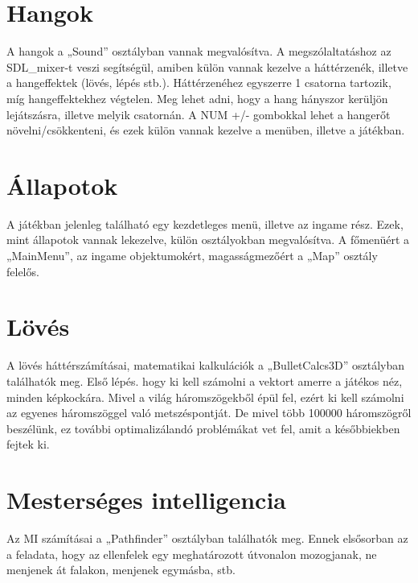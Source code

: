 \section{Hangok}

A hangok a „Sound” osztályban vannak megvalósítva. A megszólaltatáshoz az SDL\_mixer-t veszi segítségül, amiben külön vannak kezelve a háttérzenék, illetve a hangeffektek (lövés, lépés stb.). Háttérzenéhez egyszerre 1 csatorna tartozik, míg hangeffektekhez végtelen. Meg lehet adni, hogy a hang hányszor kerüljön lejátszásra, illetve melyik csatornán. A  NUM +/- gombokkal lehet a hangerőt növelni/csökkenteni, és ezek külön vannak kezelve a menüben, illetve a játékban.

\section{Állapotok}

A játékban jelenleg található egy kezdetleges menü, illetve az ingame rész. Ezek, mint állapotok vannak lekezelve, külön osztályokban megvalósítva. A főmenüért a „MainMenu”, az ingame objektumokért, magasságmezőért a „Map” osztály felelős.

\section{Lövés}

A lövés háttérszámításai, matematikai kalkulációk a „BulletCalcs3D” osztályban találhatók meg. Első lépés. hogy ki kell számolni a vektort amerre a játékos néz, minden képkockára. Mivel a világ háromszögekből épül fel, ezért ki kell számolni az egyenes háromszöggel való metszéspontját. De mivel több 100000 háromszögről beszélünk, ez további optimalizálandó problémákat vet fel, amit a későbbiekben fejtek ki.

\section{Mesterséges intelligencia}

Az MI számításai a „Pathfinder” osztályban találhatók meg. Ennek elsősorban az a feladata, hogy az ellenfelek egy meghatározott útvonalon mozogjanak, ne menjenek át falakon, menjenek egymásba, stb.
